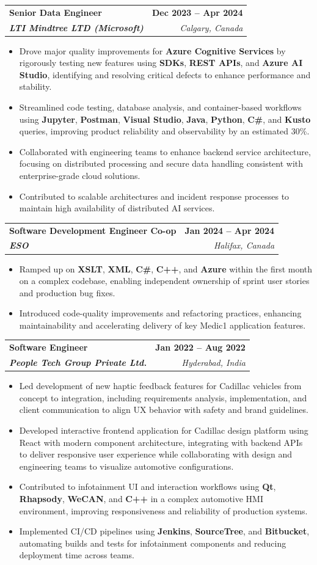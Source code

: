 \documentclass[letterpaper,11pt]{article}
\makeatletter
\newcommand{\resumeItem}[1]{
  \item\small{
    {#1 \vspace{-2pt}}
  }
}
\newcommand{\resumeSubheading}[4]{
  \vspace{-2pt}\item
    \begin{tabular*}{1.0\textwidth}[t]{l@{\extracolsep{\fill}}r}
      \textbf{#1} & \textbf{\small #2} \\
      \textit{\small#3} & \textit{\small #4} \\
    \end{tabular*}\vspace{-7pt}
}
\newcommand{\resumeItemListStart}{\begin{itemize}}
\newcommand{\resumeItemListEnd}{\end{itemize}\vspace{-5pt}}
\makeatother
\begin{document}
    \resumeSubheading
      {\textbf{Senior Data Engineer}}{\textbf{Dec 2023 -- Apr 2024}}
      {\textbf{LTI Mindtree LTD (Microsoft)}}{Calgary, Canada}
      \resumeItemListStart
        \resumeItem{Drove major quality improvements for \textbf{Azure Cognitive Services} by rigorously testing new features using \textbf{SDKs}, \textbf{REST APIs}, and \textbf{Azure AI Studio}, identifying and resolving critical defects to enhance performance and stability.}
        \resumeItem{Streamlined code testing, database analysis, and container-based workflows using \textbf{Jupyter}, \textbf{Postman}, \textbf{Visual Studio}, \textbf{Java}, \textbf{Python}, \textbf{C\#}, and \textbf{Kusto} queries, improving product reliability and observability by an estimated 30\%.}
        \resumeItem{Collaborated with engineering teams to enhance backend service architecture, focusing on distributed processing and secure data handling consistent with enterprise-grade cloud solutions.}
        \resumeItem{Contributed to scalable architectures and incident response processes to maintain high availability of distributed AI services.}
      \resumeItemListEnd
    
    \resumeSubheading
      {\textbf{Software Development Engineer Co-op}}{\textbf{Jan 2024 -- Apr 2024}}
      {\textbf{ESO}}{Halifax, Canada}
      \resumeItemListStart
        \resumeItem{Ramped up on \textbf{XSLT}, \textbf{XML}, \textbf{C\#}, \textbf{C++}, and \textbf{Azure} within the first month on a complex codebase, enabling independent ownership of sprint user stories and production bug fixes.}
        \resumeItem{Introduced code-quality improvements and refactoring practices, enhancing maintainability and accelerating delivery of key Medic1 application features.}
      \resumeItemListEnd

    \resumeSubheading
      {\textbf{Software Engineer}}{\textbf{Jan 2022 -- Aug 2022}}
      {\textbf{People Tech Group Private Ltd.}}{Hyderabad, India}
      \resumeItemListStart
        \resumeItem{Led development of new haptic feedback features for Cadillac vehicles from concept to integration, including requirements analysis, implementation, and client communication to align UX behavior with safety and brand guidelines.}
        \resumeItem{Developed interactive frontend application for Cadillac design platform using React with modern component architecture, integrating with backend APIs to deliver responsive user experience while collaborating with design and engineering teams to visualize automotive configurations.}
        \resumeItem{Contributed to infotainment UI and interaction workflows using \textbf{Qt}, \textbf{Rhapsody}, \textbf{WeCAN}, and \textbf{C++} in a complex automotive HMI environment, improving responsiveness and reliability of production systems.}
        \resumeItem{Implemented CI/CD pipelines using \textbf{Jenkins}, \textbf{SourceTree}, and \textbf{Bitbucket}, automating builds and tests for infotainment components and reducing deployment time across teams.}
      \resumeItemListEnd
\end{document}
